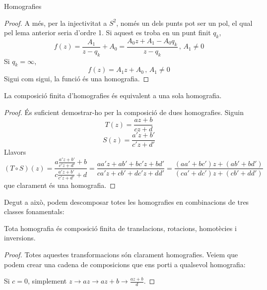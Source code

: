 \documentclass[dvipsnames, svgnames, leqno, a4paper, 12pt]{report}
\begin{document}
\begin{chapter}{Homografies}
\begin{proof}
            A més, per la injectivitat a $S^2$, només un dels punts pot ser un pol, el qual pel lema anterior seria d'ordre 1. Si aquest es troba en un punt finit $q_k$, \begin{displaymath}
                f(z)=\frac{A_1}{z-q_k}+A_0=\frac{A_0z+A_1-A_0q_k}{z-q_k}\,\text{, } A_1\neq0
            \end{displaymath}
            Si $q_k=\infty$, \begin{displaymath}
                f(z)=A_1z+A_0\, \text{, } A_1\neq0
            \end{displaymath}
            Sigui com sigui, la funció és una homografia.
        \end{proof}
        \begin{proposition}\label{prop:comp_homo}
            La composició finita d'homografies és equivalent a una sola homografia.
        \end{proposition}
        \begin{proof}
            És suficient demostrar-ho per la composició de dues homografies. Siguin \begin{displaymath}
                T(z)=\frac{az+b}{cz+d}
            \end{displaymath}
            \begin{displaymath}
                S(z)=\frac{a'z+b'}{c'z+d'}
            \end{displaymath}
            Llavors\begin{displaymath}
                (T\circ S)(z)=\frac{a\frac{a'z+b'}{c'z+d'}+b}{c\frac{a'z+b'}{c'z+d'}+d}=\frac{aa'z+ab'+bc'z+bd'}{ca'z+cb'+dc'z+dd'}=\frac{\left( aa'+bc' \right)z+(ab'+bd')}{\left( ca'+dc' \right)z+(cb'+dd')}
            \end{displaymath}
            que clarament és una homografia.
        \end{proof}
        Degut a això, podem descomposar totes les homografies en combinacions de tres classes fonamentals:
        \begin{theorem}
            Tota homografia és composició finita de translacions, rotacions, homotècies i inversions.
        \end{theorem}
        \begin{proof}
            Totes aquestes transformacions són clarament homografies. Veiem que podem crear una cadena de composicions que ens porti a qualsevol homografia:
            
            Si $c=0$, simplement $z\to az\to az+b\to \frac{az+b}{d}$.


\end{proof}
\end{chapter}
\end{document}
